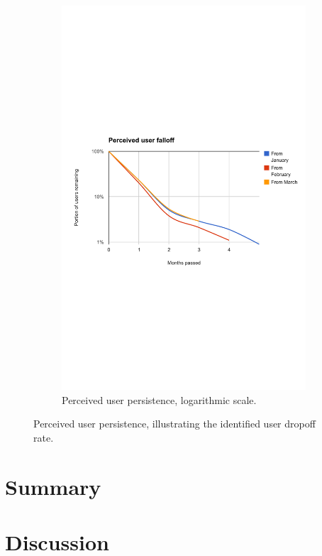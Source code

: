 \begin{figure}[t]
  \begin{subfigure}[t]{\textwidth}
    \includegraphics[width=\textwidth]{Figures/plots/user-dropoff/months-jan-mar-log}
    \caption{Perceived user persistence, logarithmic scale.}
  \end{subfigure}

  \caption{Perceived user persistence, illustrating the identified user dropoff rate.}
  \label{fig:perceived_user_persistence}
\end{figure}

\section{Summary} %
\label{eval:sec:summary}

\vspace{10cm}


\section{Discussion} %
\label{eval:sec:discussion}

